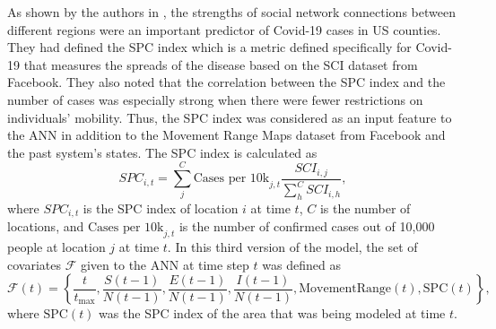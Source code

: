 As shown by the authors in \cite{kuchlerGeographicSpreadCOVID192020}, the strengths of social network connections between different regions were an important predictor of Covid-19 cases in US counties.
They had defined the \gls{SPC} index which is a metric defined specifically for Covid-19 that measures the spreads of the disease based on the \gls{SCI} dataset from Facebook.
They also noted that the correlation between the \gls{SPC} index and the number of cases was especially strong when there were fewer restrictions on individuals' mobility.
Thus, the \gls{SPC} index was considered as an input feature to the \gls{ANN} in addition to the Movement Range Maps dataset from Facebook and the past system's states.
The \gls{SPC} index is calculated as
\begin{equation}
    SPC_{i,t} = \sum_j^C \text{Cases per 10k}_{j,t} \frac{SCI_{i,j}}{\sum_h^C SCI_{i,h}},
\end{equation}
where $SPC_{i,t}$ is the \gls{SPC} index of location $i$ at time $t$, $C$ is the number of locations, and $\text{Cases per 10k}_{j,t}$ is the number of confirmed cases out of 10,000 people at location $j$ at time $t$.
In this third version of the model, the set of covariates $\mathcal{F}$ given to the \gls{ANN} at time step $t$ was defined as
\begin{equation}
    \mathcal{F}(t) = \left\lbrace \frac{t}{t_\text{max}}, \frac{S(t-1)}{N(t-1)}, \frac{E(t-1)}{N(t-1)}, \frac{I(t-1)}{N(t-1)}, \text{MovementRange}(t), \text{SPC}(t) \right\rbrace,
\end{equation}
where $\text{SPC}(t)$ was the \gls{SPC} index of the area that was being modeled at time $t$.